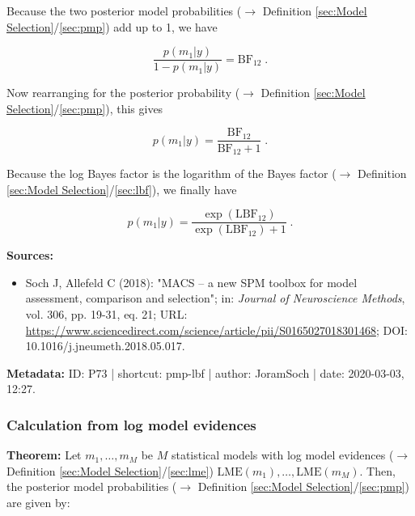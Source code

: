 \documentclass[a4paper,12pt,twoside]{book}
\begin{document}
Because the two posterior model probabilities ($\rightarrow$ Definition \ref{sec:Model Selection}/\ref{sec:pmp}) add up to 1, we have

\begin{equation} \label{eq:pmp-lbf-post-odds-s3}
\frac{p(m_1|y)}{1-p(m_1|y)} = \mathrm{BF}_{12} \; .
\end{equation}

Now rearranging for the posterior probability ($\rightarrow$ Definition \ref{sec:Model Selection}/\ref{sec:pmp}), this gives

\begin{equation} \label{eq:pmp-lbf-post-s1}
p(m_1|y) = \frac{\mathrm{BF}_{12}}{\mathrm{BF}_{12} + 1} \; .
\end{equation}

Because the log Bayes factor is the logarithm of the Bayes factor ($\rightarrow$ Definition \ref{sec:Model Selection}/\ref{sec:lbf}), we finally have

\begin{equation} \label{eq:pmp-lbf-post-s2}
p(m_1|y) = \frac{\exp(\mathrm{LBF}_{12})}{\exp(\mathrm{LBF}_{12}) + 1} \; .
\end{equation}


\vspace{1em}
\textbf{Sources:}
\begin{itemize}
\item Soch J, Allefeld C (2018): "MACS – a new SPM toolbox for model assessment, comparison and selection"; in: \textit{Journal of Neuroscience Methods}, vol. 306, pp. 19-31, eq. 21; URL: \url{https://www.sciencedirect.com/science/article/pii/S0165027018301468}; DOI: 10.1016/j.jneumeth.2018.05.017.
\end{itemize}


\vspace{1em}
\textbf{Metadata:} ID: P73 | shortcut: pmp-lbf | author: JoramSoch | date: 2020-03-03, 12:27.
\vspace{1em}



\subsubsection[\textbf{Calculation from log model evidences}]{Calculation from log model evidences} \label{sec:pmp-lme}
\setcounter{equation}{0}

\textbf{Theorem:} Let $m_1, \ldots, m_M$ be $M$ statistical models with log model evidences ($\rightarrow$ Definition \ref{sec:Model Selection}/\ref{sec:lme}) $\mathrm{LME}(m_1), \ldots, \mathrm{LME}(m_M)$. Then, the posterior model probabilities ($\rightarrow$ Definition \ref{sec:Model Selection}/\ref{sec:pmp}) are given by:
\end{document}
